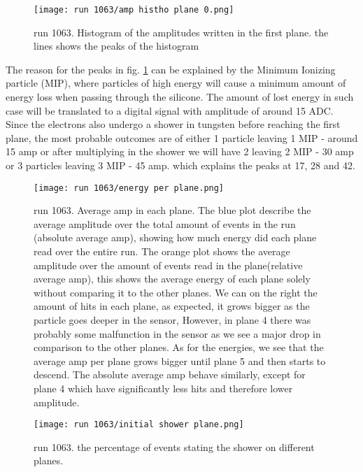 \documentclass[11pt]{article}
\begin{document}
\begin{figure}[htbp]
    \centering  \texttt{[image: run 1063/amp histho plane 0.png]}
    \caption{run 1063. Histogram of the amplitudes written in the first plane. the lines shows the peaks of the histogram}
    \label{amp histo plane 0}
\end{figure}



The reason for the peaks in fig. \ref{amp histo plane 0} can be explained by the Minimum Ionizing particle (MIP), where particles of high energy will cause a minimum amount of energy loss when passing through the silicone. The amount of lost energy in such case will be translated to a digital signal with amplitude of around 15 ADC. Since the electrons also undergo a shower in tungsten before reaching the first plane, the most probable outcomes are of either 1 particle leaving 1 MIP - around 15 amp or after multiplying in the shower we will have 2 leaving 2 MIP - 30 amp or 3 particles leaving 3 MIP - 45 amp. which explains the peaks at 17, 28 and 42.






\begin{figure}[htbp]
    \centering  \texttt{[image: run 1063/energy per plane.png]}
    \caption{run 1063. Average amp in each plane. The blue plot describe the average amplitude over the total amount of events in the run (absolute average amp), showing how much energy did each plane read over the entire run. The orange plot shows the average amplitude over the amount of events read in the plane(relative average amp), this shows the average energy of each plane solely without comparing it to the other planes. We can on the right the amount of hits in each plane, as expected, it grows bigger as the particle goes deeper in the sensor, However, in plane 4 there was probably some malfunction in the sensor as we see a major drop in comparison to the other planes. As for the energies, we see that the average amp per plane grows bigger until plane 5 and then starts to descend. The absolute average amp behave similarly, except for plane 4 which have significantly less hits and therefore lower amplitude.}
    \label{avg-amp-per-plane-run-1101}
\end{figure}




\begin{figure}[htbp]
    \centering  \texttt{[image: run 1063/initial shower plane.png]}
    \caption{run 1063. the percentage of events stating the shower on different planes.}
    \label{empty first planes run 1101}
\end{figure}
\end{document}
